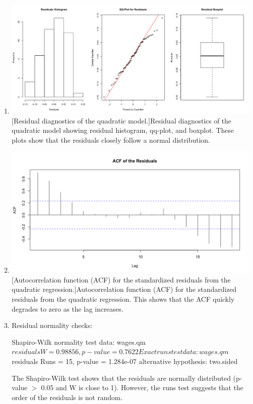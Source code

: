 \begin{enumerate}[label=(\alph*)]
\begin{figure}[!h]
        \caption[Standardized residual plot for the quadratic fit.]{Standardized residual plot for the quadratic fit. Here, we observe that these most of these residuals are in the $\pm2$ region. So, the quadratic fit is better than the linear one.}
        \label{fig:sr_q}
    \end{figure}
\item 
\begin{minipage}[!h]{\linewidth}
    \centering
    \includegraphics[width=\linewidth]{Images/P1/RD_P1.png}
    [Residual diagnostics of the quadratic model.]{Residual diagnostics of the quadratic model showing residual histogram, qq-plot, and boxplot. These plots show that the residuals closely follow a normal distribution.}
    \label{fig:rd_p1}
\end{minipage}
\item \begin{minipage}[!h]{\linewidth}
\centering
\includegraphics[width=0.9\linewidth]{Images/P1/ACF_P1.png}
[Autocorrelation  function (ACF)  for  the  standardized  residuals  from  the  quadratic regression.]{Autocorrelation  function (ACF)  for  the  standardized  residuals  from  the  quadratic regression. This shows that the ACF quickly degrades to zero as the lag increases.}
\end{minipage}
\item Residual normality checks: \small\begin{block}
Shapiro-Wilk normality test
data:  wages.qm$residuals
W = 0.98856, p-value = 0.7622

Exact runs test
data:  wages.qm$residuals
Runs = 15, p-value = 1.284e-07
alternative hypothesis: two.sided
\end{block}
\normalsize
The Shapiro-Wilk test shows that the residuals are normally distributed (p-value $>$ 0.05 and W is close to 1). However, the runs test suggests that the order of the residuals is not random. 
\end{enumerate}